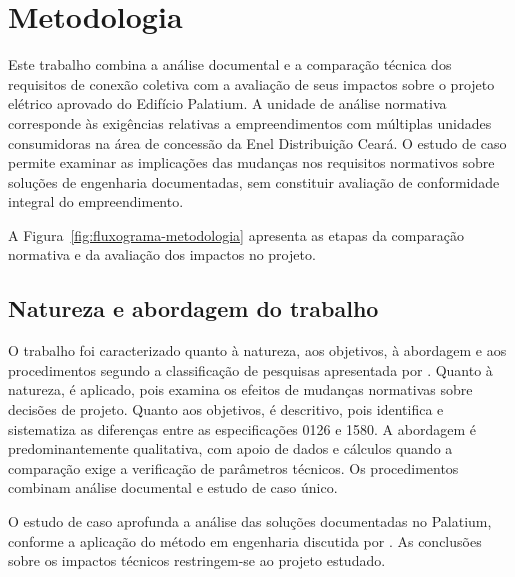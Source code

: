\chapter{Metodologia}
\label{cap:metodologia}

Este trabalho combina a análise documental e a comparação técnica dos requisitos de conexão coletiva com a avaliação de seus impactos sobre o projeto elétrico aprovado do Edifício Palatium. A unidade de análise normativa corresponde às exigências relativas a empreendimentos com múltiplas unidades consumidoras na área de concessão da Enel Distribuição Ceará. O estudo de caso permite examinar as implicações das mudanças nos requisitos normativos sobre soluções de engenharia documentadas, sem constituir avaliação de conformidade integral do empreendimento.

A Figura~\ref{fig:fluxograma-metodologia} apresenta as etapas da comparação normativa e da avaliação dos impactos no projeto.

\par\noindent
\begin{minipage}{\linewidth}
  \label{fig:fluxograma-metodologia}
  \vspace{0.7\baselineskip}
  {\centering\par}
\end{minipage}
\par

\section{Natureza e abordagem do trabalho}
\label{sec:tipo-pesquisa}

O trabalho foi caracterizado quanto à natureza, aos objetivos, à abordagem e aos procedimentos segundo a classificação de pesquisas apresentada por . Quanto à natureza, é aplicado, pois examina os efeitos de mudanças normativas sobre decisões de projeto. Quanto aos objetivos, é descritivo, pois identifica e sistematiza as diferenças entre as especificações 0126 e 1580. A abordagem é predominantemente qualitativa, com apoio de dados e cálculos quando a comparação exige a verificação de parâmetros técnicos. Os procedimentos combinam análise documental e estudo de caso único.

O estudo de caso aprofunda a análise das soluções documentadas no Palatium, conforme a aplicação do método em engenharia discutida por . As conclusões sobre os impactos técnicos restringem-se ao projeto estudado.

